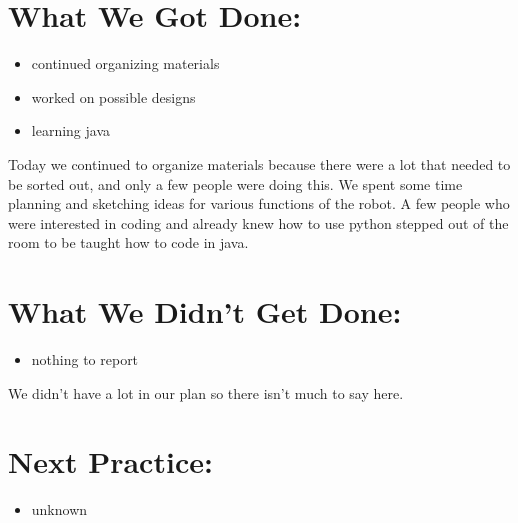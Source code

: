 \documentclass[12pt]{article}
\begin{document}
\section{What We Got Done:} %
\begin{itemize}
	\item continued organizing materials
	\item worked on possible designs 
	\item learning java

\end{itemize}

Today we continued to organize materials because there were a lot that needed to be sorted out, and only a few people were doing this. We spent some time planning and sketching ideas for various functions of the robot. A few people who were interested in coding and already knew how to use python stepped out of the room to be taught how to code in java. 

\section{What We Didn't Get Done:} %
\begin{itemize}
	\item nothing to report
\end{itemize}

We didn’t have a lot in our plan so there isn’t much to say here.
\section{Next Practice:}
\begin{itemize}
	\item unknown
\end{itemize}
\end{document}
